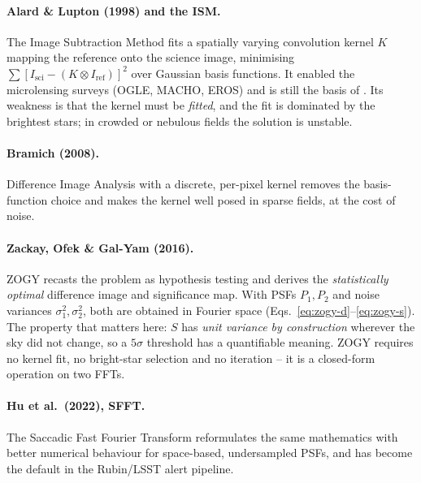\documentclass[11pt,a4paper]{article}
\newcommand{\code}[1]{\texttt{\small\detokenize{#1}}}
\begin{document}
\paragraph{Alard \& Lupton (1998) and the ISM.} The Image Subtraction Method fits a spatially varying
convolution kernel $K$ mapping the reference onto the science image, minimising
$\sum [I_{\mathrm{sci}} - (K \otimes I_{\mathrm{ref}})]^2$ over Gaussian basis functions. It enabled
the microlensing surveys (OGLE, MACHO, EROS) and is still the basis of \code{ISIS}. Its weakness is
that the kernel must be \emph{fitted}, and the fit is dominated by the brightest stars; in crowded or
nebulous fields the solution is unstable.

\paragraph{Bramich (2008).} Difference Image Analysis with a discrete, per-pixel kernel removes the
basis-function choice and makes the kernel well posed in sparse fields, at the cost of noise.

\paragraph{Zackay, Ofek \& Gal-Yam (2016).} ZOGY recasts the problem as hypothesis testing and derives
the \emph{statistically optimal} difference image and significance map. With PSFs $P_1, P_2$ and
noise variances $\sigma_1^2, \sigma_2^2$, both are obtained in Fourier space
(Eqs.~\ref{eq:zogy-d}--\ref{eq:zogy-s}). The property that matters here: $S$ has \emph{unit variance
by construction} wherever the sky did not change, so a $5\sigma$ threshold has a quantifiable
meaning. ZOGY requires no kernel fit, no bright-star selection and no iteration -- it is a closed-form
operation on two FFTs.

\paragraph{Hu et al.\ (2022), SFFT.} The Saccadic Fast Fourier Transform reformulates the same
mathematics with better numerical behaviour for space-based, undersampled PSFs, and has become the
default in the Rubin/LSST alert pipeline.
\end{document}
